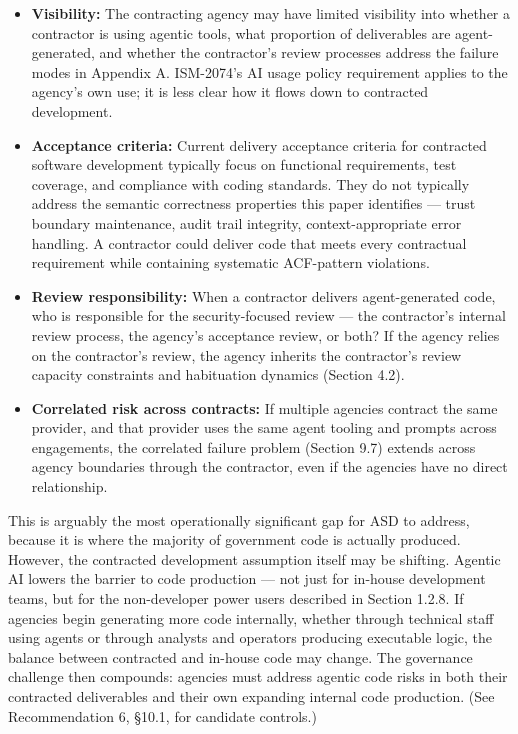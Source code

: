 \documentclass[a4paper,11pt]{report}
\providecommand{\tightlist}{%
  \setlength{\itemsep}{0pt}\setlength{\parskip}{0pt}}
\begin{document}
\begin{itemize}
\tightlist
\item
  \textbf{Visibility:} The contracting agency may have limited
  visibility into whether a contractor is using agentic tools, what
  proportion of deliverables are agent-generated, and whether the
  contractor's review processes address the failure modes in Appendix A.
  ISM-2074's AI usage policy requirement applies to the agency's own
  use; it is less clear how it flows down to contracted development.
\item
  \textbf{Acceptance criteria:} Current delivery acceptance criteria for
  contracted software development typically focus on functional
  requirements, test coverage, and compliance with coding standards.
  They do not typically address the semantic correctness properties this
  paper identifies --- trust boundary maintenance, audit trail
  integrity, context-appropriate error handling. A contractor could
  deliver code that meets every contractual requirement while containing
  systematic ACF-pattern violations.
\item
  \textbf{Review responsibility:} When a contractor delivers
  agent-generated code, who is responsible for the security-focused
  review --- the contractor's internal review process, the agency's
  acceptance review, or both? If the agency relies on the contractor's
  review, the agency inherits the contractor's review capacity
  constraints and habituation dynamics (Section 4.2).
\item
  \textbf{Correlated risk across contracts:} If multiple agencies
  contract the same provider, and that provider uses the same agent
  tooling and prompts across engagements, the correlated failure problem
  (Section 9.7) extends across agency boundaries through the contractor,
  even if the agencies have no direct relationship.
\end{itemize}

This is arguably the most operationally significant gap for ASD to
address, because it is where the majority of government code is actually
produced. However, the contracted development assumption itself may be
shifting. Agentic AI lowers the barrier to code production --- not just
for in-house development teams, but for the non-developer power users
described in Section 1.2.8. If agencies begin generating more code
internally, whether through technical staff using agents or through
analysts and operators producing executable logic, the balance between
contracted and in-house code may change. The governance challenge then
compounds: agencies must address agentic code risks in both their
contracted deliverables and their own expanding internal code
production. (See Recommendation 6, §10.1, for candidate controls.)
\end{document}

